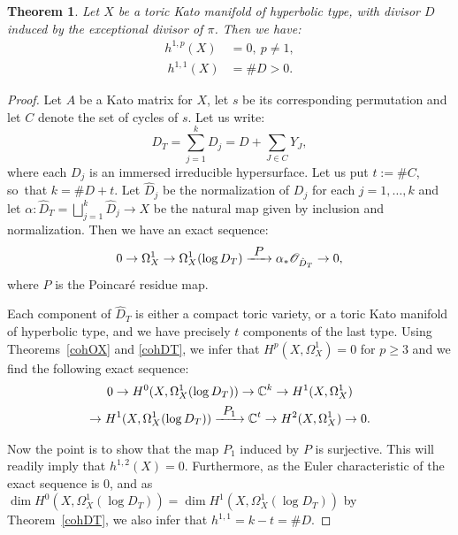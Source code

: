 \documentclass[JEP,XML,SOM,Unicode,NoFloatCountersInSection]{cedram}
\let\mathcal\mathscr
\newtheorem{theorem}{Theorem}[section]
\theoremstyle{definition}
\let\sharp\#
\newcommand{\To}[1]{\mathchoice{\xrightarrow{\textstyle\kern4pt#1\kern3pt}}{\stackrel{#1}{\longrightarrow}}{}{}}
\let\al\alpha
\newcommand{\CC}{\mathbb{C}}
\newcommand{\Oo}{\mathcal{O}}
\begin{document}
\begin{theorem}\label{cohOX2}
Let $X$ be a toric Kato manifold of hyperbolic type, with divisor $D$ induced by the exceptional divisor of $\pi$. Then we have:
\begin{align*}
h^{1,p}(X)&=0, \ p\neq 1,\\
\ h^{1,1}(X)&=\sharp D>0.
\end{align*}
\end{theorem}
\begin{proof}
Let $A$ be a Kato matrix for $X$, let $s$ be its corresponding permutation and let $C$ denote the set of cycles of $s$. Let us write:
\begin{equation*}
D_T=\sum_{j=1}^k D_j=D+\sum_{J\in C}Y_J,
\end{equation*}
where each $D_j$ is an immersed irreducible hypersurface. Let us put $t:=\sharp C$, so~that $k=\sharp D+t$. Let $\hat{D}_j$ be the normalization of $D_j$ for each $j=1,\ldots, k$ and let \hbox{$\al:\hat{D}_T=\bigsqcup_{j=1}^k\hat{D}_j\to X$} be the natural map given by inclusion and normalization. Then we have an exact sequence:
\begin{equation}\label{Residue}
0\to \Omega_X^1\to \Omega^1_X(\log D_T)\To P \al_*\Oo_{\hat{D}_T}\to 0,
\end{equation}
where $P$ is the Poincaré residue map.

Each component of $\hat{D}_T$ is either a compact toric variety, or a toric Kato manifold of hyperbolic type, and we have precisely $t$ components of the last type. Using Theorems~\ref{cohOX} and \ref{cohDT}, we infer that $H^p(X,\Omega^1_X)=0$ for $p\geq 3$ and we find the following exact sequence:
\begin{multline}\label{ExactSeq}
0\to H^0(X,\Omega^1_X(\log D_T))\to \CC^k\to H^1(X,\Omega^1_X)\\
\to H^1(X,\Omega^1_X(\log D_T))\To{P_1}\CC^{t}\to H^2(X,\Omega^1_X)\to 0.
\end{multline}

Now the point is to show that the map $P_1$ induced by $P$ is surjective. This will readily imply that $h^{1,2}(X)=0$. Furthermore, as the Euler characteristic of the exact sequence is $0$, and as $\dim H^0(X,\Omega^1_X(\log D_T))=\dim H^1(X,\Omega^1_X(\log D_T))$ by Theorem~\ref{cohDT}, we also infer that $h^{1,1}=k-t=\sharp D$.


\end{proof}
\end{document}
